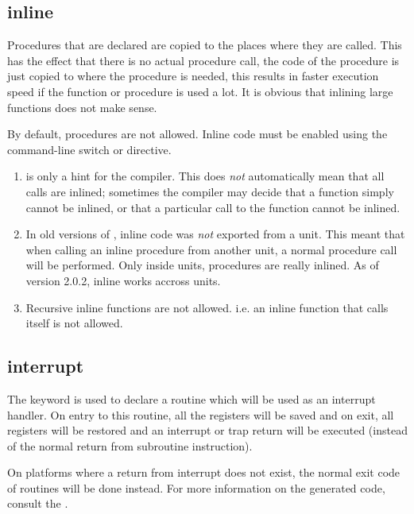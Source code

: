 \subsection{inline}
\label{se:inline}
Procedures that are declared  are copied to the places where they
are called. This has the effect that there is no actual procedure call,
the code of the procedure is just copied to where the procedure is needed,
this results in faster execution speed if the function or procedure is
used a lot. It is obvious that inlining large functions does not make sense.

By default,  procedures are not allowed. Inline code must be enabled
using the command-line switch  or 
directive.

\begin{remark}
\begin{enumerate}
\item {} is only a hint for the compiler. This does {\em not}
automatically mean that all calls are inlined; sometimes the compiler
may decide that a function simply cannot be inlined, or that a particular call
to the function cannot be inlined.
\item In old versions of \fpc, inline code was {\em not} exported from a unit. This
meant that when calling an inline procedure from another unit, a normal procedure 
call will be performed. Only inside units,  procedures are really inlined.
As of version 2.0.2, inline works accross units.
\item Recursive inline functions are not allowed. i.e. an inline function
that calls itself is not allowed.
\end{enumerate}
\end{remark}

\subsection{interrupt}
\label{se:interrupt}
The  keyword is used to declare a routine which will
be used as an interrupt handler. On entry to this routine, all the registers
will be saved and on exit, all registers will be restored
and an interrupt or trap return will be executed (instead of the normal return
from subroutine instruction).

On platforms where a return from interrupt does not exist, the normal exit
code of routines will be done instead. For more information on the generated
code, consult the \progref.

